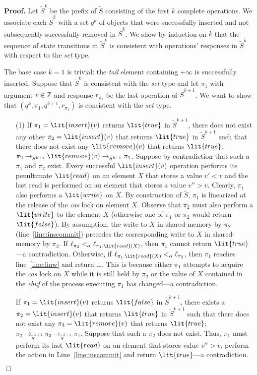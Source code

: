 \documentclass[11pt,pdftex,letterpaper]{article}
\newenvironment{proof}[1][Proof]{\noindent\textbf{#1.} }{\hfill $\Box$\\[2mm]}
\newcommand{\true}{\lit{true}}
\newcommand{\false}{\lit{false}}
\begin{document}
\begin{proof}
Let ${\tilde S}^k$ be the prefix of $\tilde S$ consisting of
the first $k$ complete operations. 
We associate each ${\tilde S}^k$ with a set $q^k$ of objects that were
successfully inserted and not subsequently successfully removed in ${\tilde S}^k$.
We show by induction on $k$ that the sequence of state transitions in
${\tilde S}^k$ is consistent with operations' responses in ${\tilde
  S}^k$ with respect to the \textit{set} type. 

The base case $k=1$ is trivial: the \textit{tail} element containing
$+\infty$ is successfully inserted.
Suppose that ${\tilde S}^k$ is consistent with the \emph{set} type and
let $\pi_1$ with argument $v\in \mathbb{Z}$ and response $r_{\pi_{1}}$
be the last operation of ${\tilde S}^{k+1}$.  
We want to show that $(q^k,\pi_1,q^{k+1},r_{\pi_{1}})$ is consistent with the \textit{set} type. 
\begin{enumerate}
\item[(1)]
If $\pi_1=\lit{insert}(v)$ returns $\true$ in ${\tilde S}^{k+1}$, there does not exist any other $\pi_2=\lit{insert}(v)$ that returns $\true$ in ${\tilde S}^{k+1}$ such that there does not exist any $\lit{remove}(v)$ that returns $\true$; $\pi_2 \rightarrow_{{\tilde S}^{k+1}} \lit{remove}(v) \rightarrow_{{\tilde S}^{k+1}} \pi_1$.
Suppose by contradiction that such a $\pi_1$ and $\pi_2$ exist.
Every successful $\lit{insert}(v)$ operation performs its penultimate $\lit{read}$ on an element $X$ that stores a value $v'<v$ and the last read is performed on an element that stores a value $v''>v$. Clearly, $\pi_1$ also performs a $\lit{write}$ on $X$.
By construction of $\tilde S$, $\pi_1$ is linearized at the release of the \emph{cas} lock on element $X$.
Observe that $\pi_2$ must also perform a $\lit{write}$ to the element $X$ (otherwise one of $\pi_1$ or $\pi_2$ would return $\false$).
By assumption, the write to $X$ in shared-memory by $\pi_2$
(line~\ref{line:inscommit}) precedes the corresponding write to $X$ in
shared-memory by $\pi_2$. If $\ell_{\pi_2} <_{\alpha}
\ell_{\pi_{1}.\lit{read}(X)}$, then $\pi_1$ cannot return $\true$---a contradiction.
Otherwise, if $\ell_{\pi_{1}.\lit{read}(X)}  <_{\alpha} \ell_{\pi_2}$,
then $\pi_1$ reaches line~\ref{line:linw} and return
$\bot$. This is because either $\pi_1$ attempts to acquire the
\emph{cas} lock on $X$ while it is still held by $\pi_2$ or the value
of $X$ contained in the \emph{rbuf} of the process executing $\pi_1$
has changed---a contradiction. 

If $\pi_1=\lit{insert}(v)$ returns $\false$ in ${\tilde S}^{k+1}$, there exists a $\pi_2=\lit{insert}(v)$ that returns $\true$ in ${\tilde S}^{k+1}$ such that there does not exist any $\pi_3=\lit{remove}(v)$ that returns $\true$; $\pi_2 \rightarrow_{{\tilde S}^{k+1}} \pi_3 \rightarrow_{{\tilde S}^{k+1}} \pi_1$. 
Suppose that such a $\pi_2$ does not exist. Thus, $\pi_1$ must perform
its last $\lit{read}$ on an element that stores value $v''>v$, perform
the action in Line~\ref{line:inscommit} and return $\true$---a contradiction.


\end{enumerate}
\end{proof}
\end{document}
